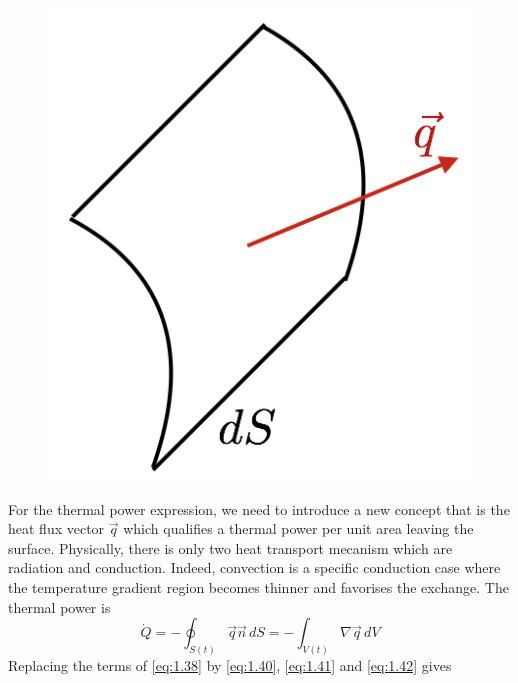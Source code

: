 		\begin{figure}
		\vspace{-5mm}
		\includegraphics[scale=0.3]{ch1/6}
		\end{figure}
		For the thermal power expression, we need to introduce a new concept that is the heat flux vector $\vec{q}$ which qualifies a thermal power per unit area leaving the surface. Physically, there is only two heat transport mecanism which are radiation and conduction. Indeed, convection is a specific conduction case where the temperature gradient region becomes thinner and favorises the exchange. The thermal power is 
		\begin{equation}
			\dot{Q} =  - \oint _{S(t)} \vec{q} \vec{n} \, dS = - \int _{V(t)} \nabla \vec{q} \, dV
			\label{eq:1.42}
		\end{equation}
		Replacing the terms of \autoref{eq:1.38} by \autoref{eq:1.40}, \autoref{eq:1.41} and \autoref{eq:1.42} gives 
		\begin{center}
		\end{center}
		
